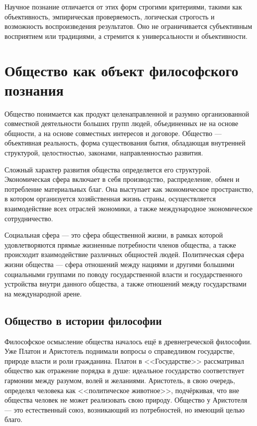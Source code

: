 \documentclass[12pt,a4paper]{article}
\begin{document}
	Научное познание отличается от этих форм строгими критериями, такими как объективность, эмпирическая проверяемость, логическая строгость и возможность воспроизведения результатов. Оно не ограничивается субъективным восприятием или традициями, а стремится к универсальности и объективности.
	
	\section{Общество как объект философского познания~\checkmark}
	Общество понимается как продукт целенаправленной и разумно организованной совместной деятельности больших групп людей, объ­единенных не на основе общности, а на основе совместных интере­сов и договоре. Общество — объективная реальность, форма существования бы­тия, обладающая внутренней структурой, целостностью, законами, на­правленностью развития.
	
	Сложный характер развития общества определяется его структу­рой. Экономическая сфера включает в себя производство, распреде­ление, обмен и потребление материальных благ. Она выступает как экономическое пространство, в котором организуется хозяйственная жизнь страны, осуществляется взаимодействие всех отраслей эконо­мики, а также международное экономическое сотрудничество.
	
	Социальная сфера — это сфера общественной жизни, в рамках которой удовлетворяются прямые жизненные потребности членов об­щества, а также происходит взаимодействие различных общностей людей. Политическая сфера жизни общества — сфера отношений между на­циями и другими большими социальными группами по поводу государ­ственной власти и государственного устройства внутри данного общест­ва, а также отношений между государствами на международной арене.
	\subsection{Общество в истории философии}
	Философское осмысление общества началось ещё в древнегреческой философии. Уже Платон и Аристотель поднимали вопросы о справедливом государстве, природе власти и роли гражданина. Платон в <<Государстве>> рассматривал общество как отражение порядка в душе: идеальное государство соответствует гармонии между разумом, волей и желаниями. Аристотель, в свою очередь, определял человека как <<политическое животное>>, подчёркивая, что вне общества человек не может реализовать свою природу. Общество у Аристотеля — это естественный союз, возникающий из потребностей, но имеющий целью благо.
	
\end{document}
